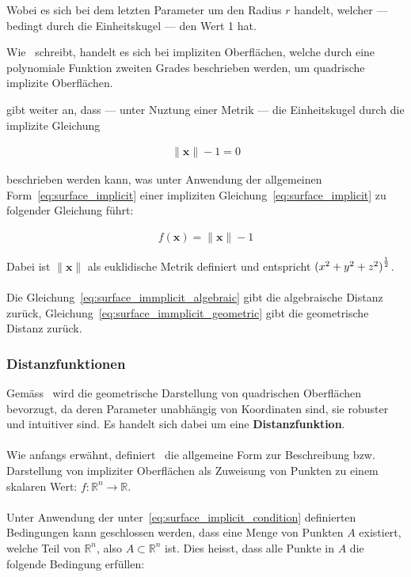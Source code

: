 Wobei es sich bei dem letzten Parameter um den Radius $r$ handelt, welcher ---
bedingt durch die Einheitskugel --- den Wert 1 hat.

Wie~\cite{division_introduction_1996} schreibt, handelt es sich bei impliziten
Oberflächen, welche durch eine polynomiale Funktion zweiten Grades beschrieben
werden, um quadrische implizite Oberflächen.

\cite{hart_sphere_1994} gibt weiter an, dass --- unter Nuztung einer Metrik ---
die Einheitskugel durch die implizite Gleichung

\begin{gather} \label{eq:surface_immplicit_geometric}
    \|\bm{x}\| - 1 = 0
\end{gather}

beschrieben werden kann, was unter Anwendung der allgemeinen
Form~\ref{eq:surface_implicit} einer impliziten
Gleichung~\ref{eq:surface_implicit} zu folgender Gleichung führt:

\begin{gather}\label{eq:surface_implicit_sphere}
    f(\bm{x}) = \|\bm{x}\| - 1
\end{gather}


Dabei ist $\|\bm{x}\|$ als euklidische Metrik definiert und entspricht ${(x^{2} + y^{2} + z^{2})}^{1 \over 2}$.\\
\\
Die Gleichung~\ref{eq:surface_immplicit_algebraic} gibt die algebraische
Distanz zurück, Gleichung~\ref{eq:surface_immplicit_geometric} gibt die
geometrische Distanz zurück.\\

\subsubsection{Distanzfunktionen}
\label{ssubsec:distance_functions}

Gemäss~\cite{hart_sphere_1994} wird die geometrische Darstellung von
quadrischen Oberflächen bevorzugt, da deren Parameter unabhängig von
Koordinaten sind, sie robuster und intuitiver sind. Es handelt sich dabei um
eine \textbf{Distanzfunktion}.\\
\\
Wie anfangs erwähnt, definiert~\cite{hart_sphere_1994} die allgemeine Form zur
Beschreibung bzw. Darstellung von impliziter Oberflächen als Zuweisung von
Punkten zu einem skalaren Wert: $ f : \mathbb{R}^{n} \to \mathbb{R} $.\\
\\
Unter Anwendung der unter~\ref{eq:surface_implicit_condition} definierten
Bedingungen kann geschlossen werden, dass eine Menge von Punkten $A$ existiert,
welche Teil von $\mathbb{R}^{n}$, also $A \subset \mathbb{R}^{n}$ ist. Dies heisst, dass alle Punkte in $A$ die folgende Bedingung erfüllen:


